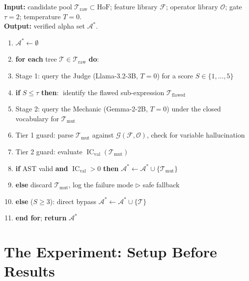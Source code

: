 \documentclass[11pt,a4paper]{article}
\begin{document}
\begin{center}\small
\begin{minipage}{0.94\linewidth}
\textbf{Input:} candidate pool $\mathcal{T}_{\text{raw}} \subset \mathrm{HoF}$;
feature library $\mathcal{F}$; operator library $\mathcal{O}$; gate
$\tau = 2$; temperature $T = 0$.\\
\textbf{Output:} verified alpha set $\mathcal{A}^{*}$.
\begin{enumerate}[leftmargin=2.2em, itemsep=1pt, topsep=2pt]
  \item $\mathcal{A}^{*} \leftarrow \emptyset$
  \item \textbf{for each} tree $\mathcal{T} \in \mathcal{T}_{\text{raw}}$
        \textbf{do}:
  \item \quad Stage 1: query the Judge (Llama-3.2-3B, $T=0$) for a score
        $S \in \{1,\dots,5\}$
  \item \quad \textbf{if} $S \le \tau$ \textbf{then}:\quad
        $\;$identify the flawed sub-expression $\mathcal{T}_{\text{flawed}}$
  \item \quad \quad Stage 2: query the Mechanic (Gemma-2-2B, $T=0$) under the
        closed vocabulary for $\mathcal{T}_{\text{mut}}$
  \item \quad \quad Tier 1 guard: parse $\mathcal{T}_{\text{mut}}$ against
        $\mathcal{G}(\mathcal{F},\mathcal{O})$, check for variable
        hallucination
  \item \quad \quad Tier 2 guard: evaluate
        $\operatorname{IC}_{\text{val}}(\mathcal{T}_{\text{mut}})$
  \item \quad \quad \textbf{if} AST valid \textbf{and}
        $\operatorname{IC}_{\text{val}} > 0$ \textbf{then}
        $\mathcal{A}^{*} \leftarrow \mathcal{A}^{*} \cup
        \{\mathcal{T}_{\text{mut}}\}$
  \item \quad \quad \textbf{else} discard $\mathcal{T}_{\text{mut}}$, log the
        failure mode \quad$\triangleright$ safe fallback
  \item \quad \textbf{else} ($S \ge 3$): direct bypass
        $\mathcal{A}^{*} \leftarrow \mathcal{A}^{*} \cup \{\mathcal{T}\}$
  \item \textbf{end for}; \textbf{return} $\mathcal{A}^{*}$
\end{enumerate}
\end{minipage}
\end{center}

\section{The Experiment: Setup Before Results}
\label{sec:setup}
\end{document}
